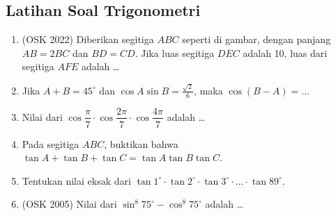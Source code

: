 \subsection{Latihan Soal Trigonometri}
\begin{enumerate}
    \item (OSK 2022) Diberikan segitiga $ABC$ seperti di gambar, dengan panjang $AB = 2BC$ dan $BD = CD$. Jika luas segitiga $DEC$ adalah 10, luas dari segitiga $AFE$ adalah \dots

	\item Jika $A+B=45^\circ$ dan $\cos A\sin B=\frac{\sqrt{2}}{6}$, maka $\cos(B-A)=\dots$
	
	\item Nilai dari $\cos \dfrac{\pi}{7}\cdot \cos \dfrac{2\pi}{7} \cdot \cos \dfrac{4\pi}{7}$ adalah \dots
	
	\item Pada segitiga $ABC$, buktikan bahwa $\tan A + \tan B + \tan C = \tan A \tan B \tan C$.
	
	\item Tentukan nilai eksak dari $\tan 1^\circ \cdot \tan 2^\circ \cdot \tan 3^\circ \cdot \ldots \cdot \tan 89^\circ$.
	
	\item (OSK 2005) Nilai dari $\sin^8 75^\circ - \cos^8 75^\circ$ adalah \dots
\end{enumerate}